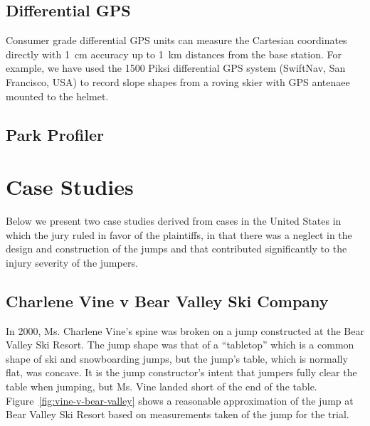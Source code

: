 \documentclass{article}
\begin{document}
\subsection{Differential GPS}
%
Consumer grade differential GPS units can measure the Cartesian coordinates
directly with 1~\si{\centi\meter} accuracy up to 1~\si{\kilo\meter}
distances from the base station. For example, we have used the 1500 Piksi
differential GPS system (SwiftNav, San Francisco, USA) to record slope shapes
from a roving skier with GPS antenaee mounted to the helmet.

\subsection{Park Profiler}

\section{Case Studies}
%
Below we present two case studies derived from cases in the United States in
which the jury ruled in favor of the plaintiffs, in that there was a neglect in
the design and construction of the jumps and that contributed significantly to
the injury severity of the jumpers.
\subsection{Charlene Vine v Bear Valley Ski Company}
%
In 2000, Ms. Charlene Vine's spine was broken on a jump constructed at the Bear Valley
Ski Resort. The jump shape was that of a ``tabletop'' which is a common shape
of ski and snowboarding jumps, but the jump's table, which is normally flat,
was concave. It is the jump constructor's intent that jumpers fully clear the
table when jumping, but Ms. Vine landed short of the end of the table.
Figure~\ref{fig:vine-v-bear-valley} shows a reasonable approximation of the
jump at Bear Valley Ski Resort based on measurements taken of the jump for the
trial.
\end{document}
